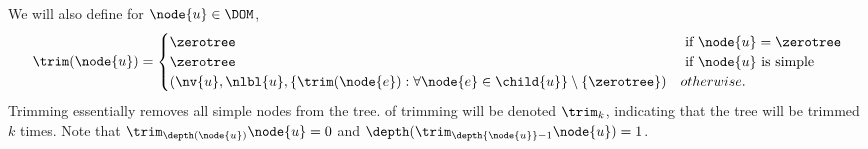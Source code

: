 \begin{definition}
  We will also define for $\node{u} \in \DOM$,
  \begin{align*}
    \trim(\node{u}) = \begin{cases}
      \zerotree & \text{ if } \node{u} = \zerotree \\
      \zerotree & \text{ if } \node{u} \text{ is simple} \\
      (\nv{u}, \nlbl{u}, \lbrace \trim(\node{e}): \forall\node{e}\in\child{u} \rbrace \setminus \{\zerotree\}) & otherwise.
    \end{cases}
  \end{align*}
  Trimming essentially removes all simple nodes from the tree.
  of trimming will be denoted $\trim_{k}$, indicating that the tree
   will be trimmed $k$ times. Note that
  $\trim_{\depth(\node{u})}{\node{u}} = 0$ and
  $\depth(\trim_{\depth{\node{u}}-1}{\node{u}}) = 1$.
\end{definition}

